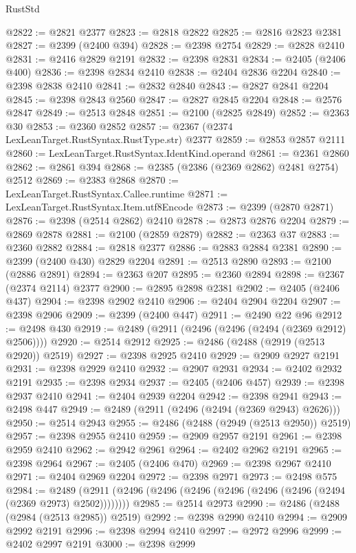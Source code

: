 \begin{lexlean}{RustStd}
\begin{coremodule}
@2822 := @2821 @2377
@2823 := @2818 @2822
@2825 := @2816 @2823 @2381
@2827 := @2399 (@2400 @394)
@2828 := @2398 @2754
@2829 := @2828 @2410
@2831 := @2416 @2829 @2191
@2832 := @2398 @2831
@2834 := @2405 (@2406 @400)
@2836 := @2398 @2834 @2410
@2838 := @2404 @2836 @2204
@2840 := @2398 @2838 @2410
@2841 := @2832 @2840
@2843 := @2827 @2841 @2204
@2845 := @2398 @2843 @2560
@2847 := @2827 @2845 @2204
@2848 := @2576 @2847
@2849 := @2513 @2848
@2851 := @2100 (@2825 @2849)
@2852 := @2363 @30
@2853 := @2360 @2852
@2857 := @2367 (@2374 LexLeanTarget.RustSyntax.RustType.str) @2377
@2859 := @2853 @2857 @2111
@2860 := LexLeanTarget.RustSyntax.IdentKind.operand
@2861 := @2361 @2860
@2862 := @2861 @394
@2868 := @2385 (@2386 (@2369 @2862) @2481 @2754) @2512
@2869 := @2383 @2868
@2870 := LexLeanTarget.RustSyntax.Callee.runtime
@2871 := LexLeanTarget.RustSyntax.Item.utf8Encode
@2873 := @2399 (@2870 @2871)
@2876 := @2398 (@2514 @2862) @2410
@2878 := @2873 @2876 @2204
@2879 := @2869 @2878
@2881 := @2100 (@2859 @2879)
@2882 := @2363 @37
@2883 := @2360 @2882
@2884 := @2818 @2377
@2886 := @2883 @2884 @2381
@2890 := @2399 (@2400 @430) @2829 @2204
@2891 := @2513 @2890
@2893 := @2100 (@2886 @2891)
@2894 := @2363 @207
@2895 := @2360 @2894
@2898 := @2367 (@2374 @2114) @2377
@2900 := @2895 @2898 @2381
@2902 := @2405 (@2406 @437)
@2904 := @2398 @2902 @2410
@2906 := @2404 @2904 @2204
@2907 := @2398 @2906
@2909 := @2399 (@2400 @447)
@2911 := @2490 @22 @96
@2912 := @2498 @430
@2919 := @2489 (@2911 (@2496 (@2496 (@2494 (@2369 @2912) @2506))))
@2920 := @2514 @2912
@2925 := @2486 (@2488 (@2919 (@2513 @2920)) @2519)
@2927 := @2398 @2925 @2410
@2929 := @2909 @2927 @2191
@2931 := @2398 @2929 @2410
@2932 := @2907 @2931
@2934 := @2402 @2932 @2191
@2935 := @2398 @2934
@2937 := @2405 (@2406 @457)
@2939 := @2398 @2937 @2410
@2941 := @2404 @2939 @2204
@2942 := @2398 @2941
@2943 := @2498 @447
@2949 := @2489 (@2911 (@2496 (@2494 (@2369 @2943) @2626)))
@2950 := @2514 @2943
@2955 := @2486 (@2488 (@2949 (@2513 @2950)) @2519)
@2957 := @2398 @2955 @2410
@2959 := @2909 @2957 @2191
@2961 := @2398 @2959 @2410
@2962 := @2942 @2961
@2964 := @2402 @2962 @2191
@2965 := @2398 @2964
@2967 := @2405 (@2406 @470)
@2969 := @2398 @2967 @2410
@2971 := @2404 @2969 @2204
@2972 := @2398 @2971
@2973 := @2498 @575
@2984 := @2489 (@2911 (@2496 (@2496 (@2496 (@2496 (@2496 (@2496 (@2494 (@2369 @2973) @2502))))))))
@2985 := @2514 @2973
@2990 := @2486 (@2488 (@2984 (@2513 @2985)) @2519)
@2992 := @2398 @2990 @2410
@2994 := @2909 @2992 @2191
@2996 := @2398 @2994 @2410
@2997 := @2972 @2996
@2999 := @2402 @2997 @2191
@3000 := @2398 @2999

\end{coremodule}
\end{lexlean}
